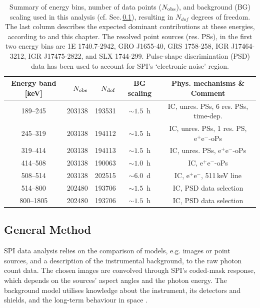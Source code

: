 \documentclass[doublespace,nopageskip]{VTthesis} %
\newcommand{\mrm}[1]{\mathrm{#1}}
\begin{document}
\begin{table}[htb]
	\centering
	\caption{Summary of energy bins, number of data points ($N_{\rm obs}$), and background (BG) scaling used in this analysis (cf. Sec.\,\ref{sec:likelihood_analysis}), resulting in $N_{dof}$ degrees of freedom. The last column describes the expected dominant contributions at these energies, according to \citet{2005A&A...444..495S} and this chapter. The resolved point sources (res. PSs), in the first two energy bins are 1E 1740.7-2942, GRO J1655-40, GRS 1758-258, IGR J17464-3212, IGR J17475-2822, and SLX 1744-299. Pulse-shape discrimination (PSD) data has been used to account for SPI's `electronic noise' region.}
	\begin{tabular}{crrcc}
        \toprule
		Energy band [keV] & $N_{\rm obs}$ & $N_{\rm dof}$ & BG scaling & Phys. mechanisms \& Comment \\
		\midrule
		189--245  & 203138 & 193531 & $\sim 1.5$~h & IC, unres. PSs, 6 res. PSs, time-dep. \\
		245--319  & 203138 & 194112 & $\sim 1.5$~h & IC, unres. PSs, 1 res. PS, $\mrm{e^+e^-}$-oPs \\
		319--414  & 203138 & 194113 & $\sim 1.5$~h & IC, unres. PSs, $\mrm{e^+e^-}$-oPs \\
		414--508  & 203138 & 190063 & $\sim 1.0$~h & IC, $\mrm{e^+e^-}$-oPs \\
		508--514  & 203138 & 202515 & $\sim 6.0$~d & IC, $\mrm{e^+e^-}$, 511\,keV line\\
		514--800  & 202480 & 193706 & $\sim 1.5$~h & IC, PSD data selection \\
		800--1805 & 202480 & 193706 & $\sim 1.5$~h & IC, PSD data selection \\
        \bottomrule
	\end{tabular}
	\label{tab:data_set_energies}
\end{table}

\subsection{General Method}\label{sec:likelihood_analysis}
%
SPI data analysis relies on the comparison of models, e.g. images or point sources, and a description of the instrumental background, to the raw photon count data.
%
The chosen images are convolved through SPI's coded-mask response, which depends on the sources' aspect angles and the photon energy.
%
The background model utilises knowledge about the instrument, its detectors and shields, and the long-term behaviour in space \citep{2018A&A...611A..12D,2019A&A...626A..73S}.
\end{document}
